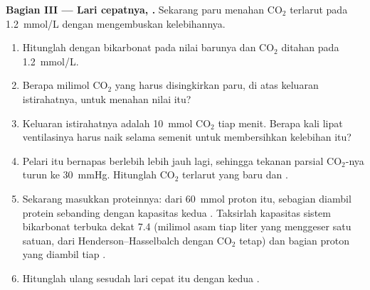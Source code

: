 \begin{problem}
\medskip
\noindent\textbf{Bagian III --- Lari cepatnya, .}
Sekarang paru menahan $\mathrm{CO_2}$ terlarut pada \qty{1.2}{mmol/L}
dengan mengembuskan kelebihannya.
\begin{enumerate}[resume]
  \item Hitunglah  dengan bikarbonat pada nilai barunya dan
        $\mathrm{CO_2}$ ditahan pada \qty{1.2}{mmol/L}.
  \item Berapa milimol $\mathrm{CO_2}$ yang harus disingkirkan paru, di
        atas keluaran istirahatnya, untuk menahan nilai itu?
  \item Keluaran istirahatnya adalah \qty{10}{mmol} $\mathrm{CO_2}$
        tiap menit. Berapa kali lipat ventilasinya harus naik selama
        semenit untuk membersihkan kelebihan itu?
  \item Pelari itu bernapas berlebih lebih jauh lagi, sehingga tekanan
        parsial $\mathrm{CO_2}$-nya turun ke \qty{30}{mmHg}. Hitunglah
        $\mathrm{CO_2}$ terlarut yang baru dan .
  \item Sekarang masukkan  proteinnya: dari \qty{60}{mmol}
        proton itu, sebagian diambil protein sebanding dengan kapasitas
        kedua . Taksirlah kapasitas sistem bikarbonat
        terbuka dekat  7.4 (milimol asam tiap liter yang menggeser
         satu satuan, dari Henderson--Hasselbalch dengan
        $\mathrm{CO_2}$ tetap) dan bagian proton yang diambil tiap
        .
  \item Hitunglah ulang  sesudah lari cepat itu dengan kedua
        .
\end{enumerate}


\end{problem}
